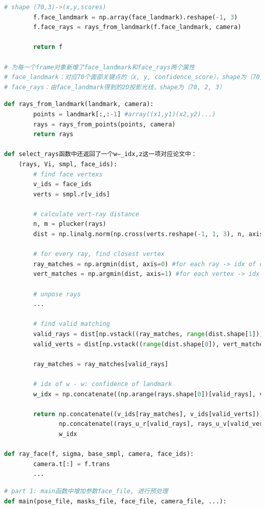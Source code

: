 \documentclass{article}
\begin{document}
\begin{appendices}
\begin{lstlisting}[language=python, title=frame.py]
        # shape (70,3)->(x,y,scores)
        f.face_landmark = np.array(face_landmark).reshape(-1, 3) 
        f.face_rays = rays_from_landmark(f.face_landmark, camera)
    
        return f

# 为每一个frame对象新增了face_landmark和face_rays两个属性
# face_landmark：对应70个面部关键点的（x, y, confidence_score），shape为（70,3）
# face_rays：由face_landmark得到的2D投影光线，shape为（70, 2, 3）
\end{lstlisting}  
\begin{lstlisting}[language=python, title=rays.py]
def rays_from_landmark(landmark, camera):
        points = landmark[:,:-1] #array((x1,y1)(x2,y2)...)
        rays = rays_from_points(points, camera)
        return rays
        
def select_rays函数中还返回了一个w—_idx,z这一项对应论文中：
    (rays, Vi, smpl, face_ids):
        # find face vertexs 
        v_ids = face_ids
        verts = smpl.r[v_ids]
    
        # calculate vert-ray distance
        n, m = plucker(rays)
        dist = np.linalg.norm(np.cross(verts.reshape(-1, 1, 3), n, axisa=2, axisb=1) - m, axis=2)

        # for every ray, find closest vertex
        ray_matches = np.argmin(dist, axis=0) #for each ray -> idx of closest vertex
        vert_matches = np.argmin(dist, axis=1) #for each vertex -> idx of closest ray
        
        # unpose rays
        ...
        
        # find valid matching
        valid_rays = dist[np.vstack((ray_matches, range(dist.shape[1]))).tolist()] < 0.12
        valid_verts = dist[np.vstack((range(dist.shape[0]), vert_matches)).tolist()] < 0.03
         
        ray_matches = ray_matches[valid_rays]
        
        # idx of w - w: confidence of landmark
        w_idx = np.concatenate((np.arange(rays.shape[0])[valid_rays], vert_matches[valid_verts]))
         
        return np.concatenate((v_ids[ray_matches], v_ids[valid_verts])), \
               np.concatenate((rays_u_r[valid_rays], rays_u_v[valid_verts])),\
               w_idx
               
def ray_face(f, sigma, base_smpl, camera, face_ids):
        camera.t[:] = f.trans  
        ...
\end{lstlisting}  
\begin{lstlisting}[title=step2\_consencus.py, language=python]  
# part 1: main函数中增加参数face_file, 进行预处理
def main(pose_file, masks_file, face_file, camera_file, ...):


\end{lstlisting}
\end{appendices}
\end{document}
